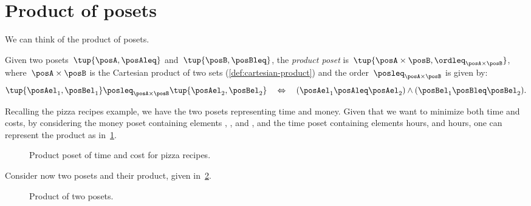 
\section{Product of posets}

We can think of the product of posets.

\begin{definition}
  \label{def:productposet}
  Given two posets~$\tup{\posA, \posAleq}$
  and~$\tup{\posB, \posBleq}$, the \emph{product poset} is~$\tup{\posA \times \posB, \ordleq_{\posA\times \posB}}$, where~$\posA \times \posB$ is the Cartesian product of two sets (\cref{def:cartesian-product}) and the order~$\posleq_{\posA \times \posB}$ is given by:
  \begin{equation}
    \tup{\posAel_1, \posBel_1}
    \posleq_{\posA\times \posB}
    \tup{\posAel_2, \posBel_2}
    \quad
    \Leftrightarrow
    \quad
    (\posAel_1 \posAleq \posAel_2) \wedge
    (\posBel_1 \posBleq \posBel_2).
  \end{equation}
\end{definition}
Recalling the pizza recipes example, we have the two posets representing time and money.
Given that we want to minimize both time and costs, by considering the money poset containing elements \unit[1]{\stdcurr}, \unit[2]{\stdcurr}, and \unit[3]{\stdcurr}, and the time poset containing elements \unit[1]{hours}, and \unit[2]{hours}, one can represent the product as in~\cref{fig:productpizza}.

\begin{figure}[h!]
  \begin{center}
  \end{center}
  \caption{Product poset of time and cost for pizza recipes.}
  \label{fig:productpizza}
\end{figure}


\begin{example}
  Consider now two posets and their product, given in~\cref{fig:composing_posets_1}.
  \begin{figure}[h!]
    \begin{center}
    \end{center}
    \caption{Product of two posets.\label{fig:composing_posets_1}}
  \end{figure}
\end{example}
